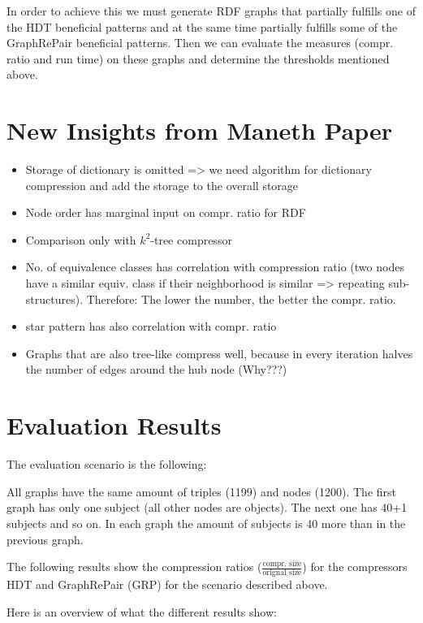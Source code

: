 \documentclass[a4paper]{scrartcl}
\begin{document}
In order to achieve this we must generate RDF graphs that partially fulfills one of the HDT beneficial patterns and at the same time partially fulfills some of the GraphRePair beneficial patterns. Then we can evaluate the measures (compr. ratio and run time) on these graphs and determine the thresholds mentioned above.


\section*{New Insights  from Maneth Paper}

\begin{itemize}
	\item Storage of dictionary is omitted => we need algorithm for dictionary compression and add the storage to the overall storage
	\item Node order has marginal input on compr. ratio for RDF
	\item Comparison only with $k^2$-tree compressor
	\item No. of equivalence classes has correlation with compression ratio (two nodes have a similar equiv. class if their neighborhood is similar => repeating sub-structures). Therefore: The lower the number, the better the compr. ratio.
	\item star pattern has also correlation with compr. ratio 
	\item Graphs that are also tree-like compress well, because in every iteration halves the number of edges around the hub node (Why???)
\end{itemize}


\section{Evaluation Results}

The evaluation scenario is the following:

All graphs have the same amount of triples (1199) and nodes (1200). The first graph has only one subject (all other nodes are objects). The next one has 40+1 subjects and so on. In each graph the amount of subjects is 40 more than in the previous graph.

The following results show the compression ratios ($ \frac{\text{compr. size}}{\text{orignal size}} $) for the compressors HDT and GraphRePair (GRP) for the scenario described above.


Here is an overview of what the different results show:
\end{document}
